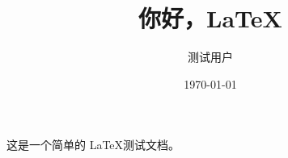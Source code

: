 \documentclass{article}
\title{你好，\LaTeX}
\author{测试用户}
\date{\today}
\begin{document}
\maketitle

这是一个简单的 \LaTeX 测试文档。
\end{document}
